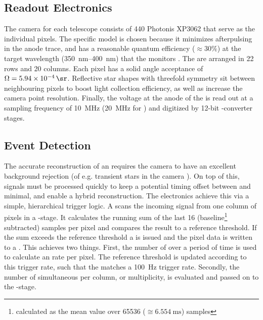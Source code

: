 \subsection{Readout Electronics}
\label{ssec:fd-camera}

The camera for each telescope consists of 440 Photonis XP3062 \PMTs that serve 
as the individual pixels. The specific model is chosen because it minimizes 
afterpulsing in the anode trace, and has a reasonable quantum efficiency 
($\approx30\%$) at the target wavelength (\SIrange{350}{400}{\nano\meter}) that 
the \FD monitors \cite{xiaoCalibrationPhotonisXP30622005}. The \PMTs are 
arranged in 22 rows and 20 columns. Each pixel has a solid angle acceptance of 
$\Omega = \SI{5.94e-4}{\sr}$. Reflective star shapes with threefold symmetry 
sit between neighbouring pixels to boost light collection efficiency, as well 
as increase the camera point resolution. Finally, the voltage at the anode of 
the \PMTs is read out at a sampling frequency of \SI{10}{\mega\hertz} 
(\SI{20}{\mega\hertz} for \HEAT) and digitized by 12-bit \ADC-converter stages. 

\subsection{Event Detection}
\label{ssec:fd-triggers}

The accurate reconstruction of an \EAS requires the camera to have an excellent
background rejection (of e.g. transient stars in the camera \FOV). On top of 
this, signals must be processed quickly to keep a potential timing offset 
between \FD and \SD minimal, and enable a hybrid reconstruction. The \FD 
electronics achieve this via a simple, hierarchical trigger logic. A \FPGA 
scans the incoming signal from one column of pixels in a \FLT-stage. It 
calculates the running sum of the last 16 (baseline\footnote{calculated as the 
mean \ADC value over 65536 ($\cong\SI{6.554}{\milli\second}$) samples} 
subtracted) \ADC samples per pixel and compares the result to a reference 
threshold. If the sum exceeds the reference threshold a \FLT is issued and the 
pixel data is written to a \SRAM. This achieves two things. First, the number 
of \FLTs over a period of time is used to calculate an \FLT rate per pixel. The
reference threshold is updated according to this trigger rate, such that the 
\FLT matches a \SI{100}{\hertz} trigger rate. Secondly, the number of 
simultaneous \FLTs per column, or multiplicity, is evaluated and passed on to 
the \SLT-stage.

